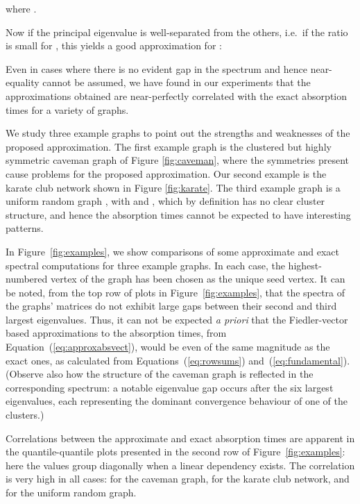 \documentclass{article}
\begin{document}
where .

Now if the principal eigenvalue  is well-separated
from the others, i.e.\ if the ratio  is small
for , this yields a good approximation for :

Even in cases where there is no evident gap in the spectrum and hence
near-equality cannot be assumed, we have found in our experiments that
the approximations obtained are near-perfectly correlated with the exact
absorption times for a variety of graphs.

We study three example graphs to point out the strengths and
weaknesses of the proposed approximation. The first example graph is
the clustered but highly symmetric caveman graph of Figure
\ref{fig:caveman}, where the symmetries present cause problems for the
proposed approximation.  Our second example is the karate club network
shown in Figure \ref{fig:karate}. The third example graph is a uniform
random graph , with  and 
\cite{Gilb59}, which by definition has no clear cluster structure, and
hence the absorption times cannot be expected to have interesting patterns.

In Figure~\ref{fig:examples}, we show comparisons of some approximate
and exact spectral computations for three example graphs.
In each case, the highest-numbered vertex
of the graph has been chosen as the unique seed vertex.
It can be noted, from the top row of plots in Figure~\ref{fig:examples},
that the spectra of the graphs'  matrices do not exhibit
large gaps between their second and third largest eigenvalues.
Thus, it can not be expected \emph{a priori} that the Fiedler-vector
based approximations to the absorption times, from
Equation~(\ref{eq:approxabsvect}), would be even
of the same magnitude as the exact ones, as calculated from
Equations~(\ref{eq:rowsums}) and~(\ref{eq:fundamental}).
(Observe also how the structure of the caveman graph is reflected
in the corresponding  spectrum: a notable eigenvalue gap
occurs after the six largest eigenvalues, each representing the
dominant convergence behaviour of one of the clusters.)

Correlations between the approximate and exact absorption times
are apparent in the quantile-quantile plots presented in the
second row of Figure~\ref{fig:examples}: here the values
group diagonally when a linear dependency exists.
The correlation is very high in all
cases:  for the caveman graph,  for the karate club
network, and  for the uniform random graph.
\end{document}
